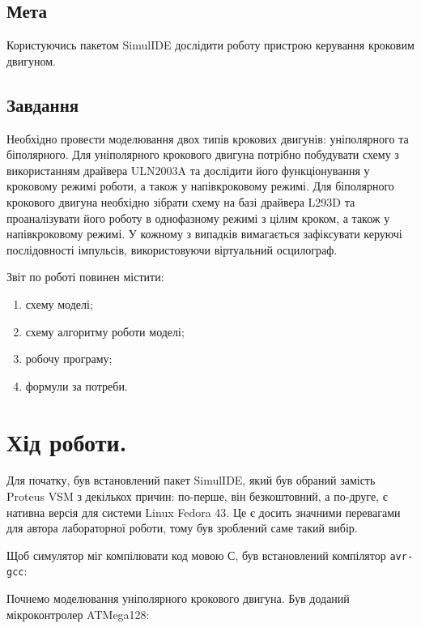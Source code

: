 \documentclass[14pt, a4paper]{extreport}
\begin{document}
	\subsection*{Мета} 
	Користуючись пакетом SimulIDE дослідити роботу пристрою керування кроковим двигуном.
	
	\subsection*{Завдання}
	Необхідно провести моделювання двох типів крокових двигунів: уніполярного та біполярного. Для уніполярного крокового двигуна потрібно побудувати схему з використанням драйвера ULN2003A та дослідити його функціонування у кроковому режимі роботи, а також у напівкроковому режимі. Для біполярного крокового двигуна необхідно зібрати схему на базі драйвера L293D та проаналізувати його роботу в однофазному режимі з цілим кроком, а також у напівкроковому режимі. У кожному з випадків вимагається зафіксувати керуючі послідовності імпульсів, використовуючи віртуальний осцилограф.
	
	Звіт по роботі повинен містити:
	
	\begin{enumerate}
		\item схему моделі;
		
		\item схему алгоритму роботи моделі;
		
		\item робочу програму;
		
		\item формули за потреби.
	\end{enumerate}
	
	\section*{Хід роботи.}
	
	Для початку, був встановлений пакет SimulIDE, який був обраний замість Proteus VSM з декількох причин: по-перше, він безкоштовний, а по-друге, є нативна версія для системи Linux Fedora 43. Це є досить значними перевагами для автора лабораторної роботи, тому був зроблений саме такий вибір.
	
	
	Щоб симулятор міг компілювати код мовою С, був встановлений компілятор \texttt{avr-gcc}:
	
	
	Почнемо моделювання уніполярного крокового двигуна. Був доданий мікроконтролер ATMega128:
	
\end{document}
